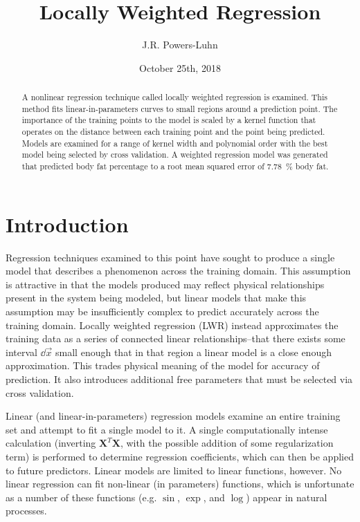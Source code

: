 \documentclass{IEEEtran}
\author{J.R. Powers-Luhn}
\title{Locally Weighted Regression}
\date{October 25th, 2018}
\begin{document}
\maketitle

\begin{abstract}

A nonlinear regression technique called locally weighted regression is examined. This method fits linear-in-parameters curves to small regions around a prediction point. The importance of the training points to the model is scaled by a kernel function that operates on the distance between each training point and the point being predicted. Models are examined for a range of kernel width and polynomial order with the best model being selected by cross validation. A weighted regression model was generated that predicted body fat percentage to a root mean squared error of \SI{7.78}{\percent} body fat.

\end{abstract}

\section{Introduction}

Regression techniques examined to this point have sought to produce a single model that describes a phenomenon across the training domain. This assumption is attractive in that the models produced may reflect physical relationships present in the system being modeled, but linear models that make this assumption may be insufficiently complex to predict accurately across the training domain. Locally weighted regression (LWR) instead approximates the training data as a series of connected linear relationships--that there exists some interval $\dd{\vec{x}}$ small enough that in that region a linear model is a close enough approximation. This trades physical meaning of the model for accuracy of prediction. It also introduces additional free parameters that must be selected via cross validation.

Linear (and linear-in-parameters) regression models examine an entire training set and attempt to fit a single model to it. A single computationally intense calculation (inverting $\mathbf{X}^T \mathbf{X}$, with the possible addition of some regularization term) is performed to determine regression coefficients, which can then be applied to future predictors. Linear models are limited to linear functions, however. No linear regression can fit non-linear (in parameters) functions, which is unfortunate as a number of these functions (e.g. $\sin$, $\exp$, and $\log$) appear in natural processes.
\end{document}
